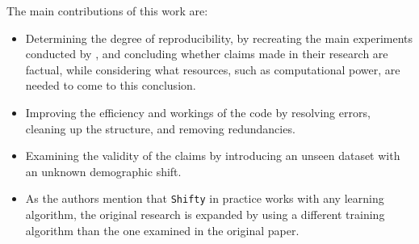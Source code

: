 The main contributions of this work are:
\begin{itemize}
    \item Determining the degree of reproducibility, by recreating the main experiments conducted by \citeauthor{giguere2022fairness}, and concluding whether claims made in their research are factual, while considering what resources, such as computational power, are needed to come to this conclusion.
    
    \item Improving the efficiency and workings of the code by resolving errors, cleaning up the structure, and removing redundancies.
    \item Examining the validity of the claims by introducing an unseen dataset with an unknown demographic shift. 
    
    \item As the authors mention that \texttt{Shifty} in practice works with any learning algorithm, the original research is expanded by using a different training algorithm than the one examined in the original paper.
\end{itemize}

